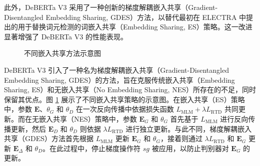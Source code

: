 此外，DeBERTa V3 采用了一种创新的梯度解耦嵌入共享（Gradient-Disentangled Embedding Sharing, GDES）方法，以替代最初在 ELECTRA 中提出的用于替换词元检测的词嵌入共享（Embedding Sharing, ES）策略。这一改进显著增强了 DeBERTa V3 的性能表现。

\begin{figure}[htbp]
\centering  
{}
\hfill
{}
\hfill
{}
\caption{不同嵌入共享方法示意图 \cite{he2023debertav3improvingdebertausing}}
\label{fig:es}
\end{figure}

DeBERTa V3 引入了一种名为梯度解耦嵌入共享（Gradient-Disentangled Embedding Sharing, GDES）的方法，旨在克服传统嵌入共享（Embedding Sharing, ES）和无嵌入共享（No Embedding Sharing, NES）所存在的不足，同时保留其优点。图 \ref{fig:es} 展示了不同嵌入共享策略的示意图。在嵌入共享（ES）策略中，参数 \(\mathbf{E}\)、\(\theta_G\) 和 \(\theta_D\) 在一次反向传播中依据损失函数 \(L_{\text{MLM}} + \lambda L_{\text{RTD}}\) 共同更新。而在无嵌入共享（NES）策略中，参数 \(\mathbf{E}_G\) 和 \(\theta_G\) 首先基于 \(L_{\text{MLM}}\) 进行反向传播更新，然后 \(\mathbf{E}_D\) 和 \(\theta_D\) 则依据 \(\lambda L_{\text{RTD}}\) 进行独立更新。与此不同，梯度解耦嵌入共享（GDES）方法首先根据 \(L_{\text{MLM}}\) 更新 \(\mathbf{E}_G\) 和 \(\theta_G\)，接着则通过 \(\lambda L_{\text{RTD}}\) 和 \(\mathbf{E}_G\) 更新 \(\mathbf{E}_{\Delta}\) 和 \(\theta_D\)。在此过程中，停止梯度操作符 \(sg\) 被应用，以防止判别器对 \(\mathbf{E}_G\) 的更新。

